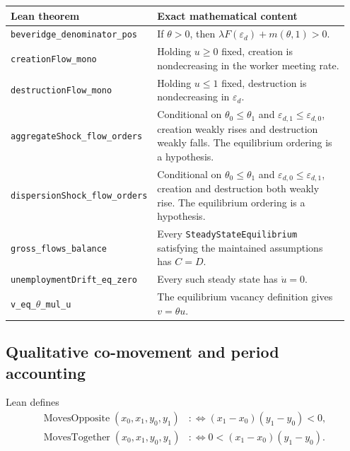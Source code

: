 \documentclass[11pt]{article}
\newcommand{\code}[1]{\texttt{#1}}
\newcommand{\breakcode}[1]{\nolinkurl{#1}}
\newcommand{\epsd}{\varepsilon_d}
\newcommand{\mworker}[1]{m(#1,1)}
\begin{document}
\begin{longtable}{@{}p{0.35\linewidth}p{0.60\linewidth}@{}}
\toprule
\textbf{Lean theorem} & \textbf{Exact mathematical content} \\
\midrule
\endhead
\breakcode{beveridge_denominator_pos} & If $\theta>0$, then
$\lambda F(\epsd)+\mworker{\theta}>0$. \\
\breakcode{creationFlow_mono} & Holding $u\ge0$ fixed, creation is nondecreasing in
the worker meeting rate. \\
\breakcode{destructionFlow_mono} & Holding $u\le1$ fixed, destruction is
nondecreasing in $\epsd$. \\
\breakcode{aggregateShock_flow_orders} & Conditional on
$\theta_0\le\theta_1$ and $\varepsilon_{d,1}\le\varepsilon_{d,0}$, creation weakly rises and destruction
weakly falls. The equilibrium ordering is a hypothesis. \\
\breakcode{dispersionShock_flow_orders} & Conditional on
$\theta_0\le\theta_1$ and $\varepsilon_{d,0}\le\varepsilon_{d,1}$, creation and destruction both weakly
rise. The equilibrium ordering is a hypothesis. \\
\breakcode{gross_flows_balance} & Every \code{SteadyStateEquilibrium} satisfying the
maintained assumptions has $C=D$. \\
\breakcode{unemploymentDrift_eq_zero} & Every such steady state has $\dot u=0$. \\
\code{v\_eq\_}$\theta$\code{\_mul\_u} & The equilibrium vacancy definition gives
$v=\theta u$. \\
\bottomrule
\end{longtable}

\subsection{Qualitative co-movement and period accounting}

Lean defines
\begin{align*}
\operatorname{MovesOpposite}(x_0,x_1,y_0,y_1)
&:\Longleftrightarrow (x_1-x_0)(y_1-y_0)<0,\\
\operatorname{MovesTogether}(x_0,x_1,y_0,y_1)
&:\Longleftrightarrow 0<(x_1-x_0)(y_1-y_0).
\end{align*}
\end{document}
